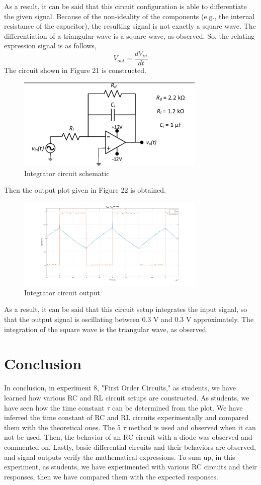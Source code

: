 \documentclass[letterpaper,12pt]{article}
\begin{document}
As a result, it can be said that this circuit configuration is able to differentiate the given signal. Because of the non-ideality of the components (e.g., the internal resistance of the capacitor), the resulting signal is not exactly a square wave. The differentiation of a triangular wave is a square wave, as observed. So, the relating expression signal is as follows,
\[V_{out} = \frac{dV_{in}}{dt}\]
\newline
The circuit shown in Figure 21 is constructed.
\begin{figure}[H]
	\centering
   \includegraphics[width=0.8\textwidth]{integrator.png}
   \caption{Integrator circuit schematic}
\end{figure} 
Then the output plot given in Figure 22 is obtained.
\begin{figure}[H]
	\centering
   \includegraphics[width=0.8\textwidth]{3.png}
   \caption{Integrator circuit output}
\end{figure} 
As a result, it can be said that this circuit setup integrates the input signal, so that the output signal is oscillating between 0.3 V and 0.3 V approximately. The integration of the square wave is the triangular wave, as observed.
\section{Conclusion}

In conclusion, in experiment 8, "First Order Circuits," as students, we have learned how various RC and RL circuit setups are constructed. As students, we have seen how the time constant \(\tau\) can be determined from the plot. We have inferred the time constant of RC and RL circuits experimentally and compared them with the theoretical ones. The 5 \(\tau\) method is used and observed when it can not be used. Then, the behavior of an RC circuit with a diode was observed and commented on. Lastly, basic differential circuits and their behaviors are observed, and signal outputs verify the mathematical expressions. To sum up, in this experiment, as students, we have experimented with various RC circuits and their responses, then we have compared them with the expected responses. 
\end{document}
